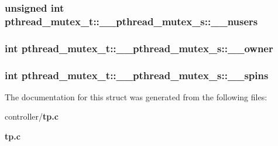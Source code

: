 \subsubsection[{\_\-\_\-nusers}]{\setlength{\rightskip}{0pt plus 5cm}unsigned int {\bf pthread\_\-mutex\_\-t::\_\-\_\-pthread\_\-mutex\_\-s::\_\-\_\-nusers}}\label{structpthread__mutex__t_1_1____pthread__mutex__s_afd062054026846354e4827648cf050b3}
\subsubsection[{\_\-\_\-owner}]{\setlength{\rightskip}{0pt plus 5cm}int {\bf pthread\_\-mutex\_\-t::\_\-\_\-pthread\_\-mutex\_\-s::\_\-\_\-owner}}\label{structpthread__mutex__t_1_1____pthread__mutex__s_a5bd4dae0b96d3429e476831c38cfa59d}
\subsubsection[{\_\-\_\-spins}]{\setlength{\rightskip}{0pt plus 5cm}int {\bf pthread\_\-mutex\_\-t::\_\-\_\-pthread\_\-mutex\_\-s::\_\-\_\-spins}}\label{structpthread__mutex__t_1_1____pthread__mutex__s_ab64df829bec5ad6799d599c3e03ce94b}


The documentation for this struct was generated from the following files:\begin{DoxyCompactItemize}
\item 
controller/{\bf tp.c}\item 
{\bf tp.c}\end{DoxyCompactItemize}
